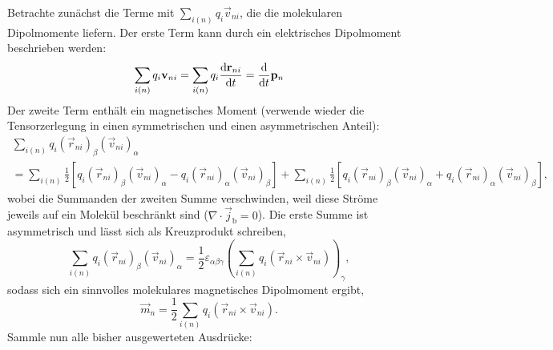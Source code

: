 Betrachte zunächst die Terme mit $\sum _{i\left(n\right)}q_{i}\vec {v}_{ni}$, die die molekularen Dipolmomente liefern. Der erste Term kann durch ein elektrisches Dipolmoment beschrieben werden:
\begin{equation*}
	\sum _{i\left(n\right)}q_{i}\mathbf{v}_{ni}=\sum _{i\left(n\right)}q_{i}\frac{\mathop{}\!\mathrm{d} \mathbf{r}_{ni}}{\mathop{}\!\mathrm{d} t}=\frac{\mathop{}\!\mathrm{d} }{\mathop{}\!\mathrm{d} t}\mathbf{p}_{n}
\end{equation*}
Der zweite Term enthält ein magnetisches Moment (verwende wieder die Tensorzerlegung in einen symmetrischen und einen asymmetrischen Anteil):
\begin{multline*}
	\sum _{i\left(n\right)}q_{i}\left(\vec {r}_{ni}\right)_{\beta }\left(\vec {v}_{ni}\right)_{\alpha }\\
	=\sum _{i\left(n\right)}\frac{1}{2}\left[q_{i}\left(\vec {r}_{ni}\right)_{\beta }\left(\vec {v}_{ni}\right)_{\alpha }-q_{i}\left(\vec {r}_{ni}\right)_{\alpha }\left(\vec {v}_{ni}\right)_{\beta }\right]+\sum _{i\left(n\right)}\frac{1}{2}\left[q_{i}\left(\vec {r}_{ni}\right)_{\beta }\left(\vec {v}_{ni}\right)_{\alpha }+q_{i}\left(\vec {r}_{ni}\right)_{\alpha }\left(\vec {v}_{ni}\right)_{\beta }\right],
\end{multline*}
wobei die Summanden der zweiten Summe verschwinden, weil diese Ströme jeweils auf ein Molekül beschränkt sind ($\nabla\cdot \vec {j}_{\mathrm{b}}=0$). Die erste Summe ist asymmetrisch und lässt sich als Kreuzprodukt schreiben,
\begin{equation*}
	\sum _{i\left(n\right)}q_{i}\left(\vec {r}_{ni}\right)_{\beta }\left(\vec {v}_{ni}\right)_{\alpha }=\frac{1}{2}\varepsilon _{\alpha \beta \gamma }\left(\sum _{i\left(n\right)}q_{i}\left(\vec {r}_{ni}\times \vec {v}_{ni}\right)\right)_{\gamma },
\end{equation*}
sodass sich ein sinnvolles molekulares magnetisches Dipolmoment ergibt,
\begin{equation*}
	\vec {m}_{n}=\frac{1}{2}\sum _{i\left(n\right)}q_{i}\left(\vec {r}_{ni}\times \vec {v}_{ni}\right).
\end{equation*}
Sammle nun alle bisher ausgewerteten Ausdrücke:
